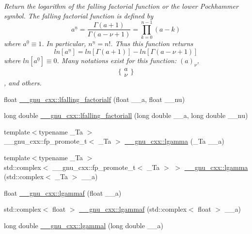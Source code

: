\begin{DoxyCompactItemize}
\begin{DoxyCompactList}\small\item\em Return the logarithm of the falling factorial function or the lower Pochhammer symbol. The falling factorial function is defined by \[ a^{\underline{n}} = \frac{\Gamma(a + 1)}{\Gamma(a - \nu + 1)} = \prod_{k=0}^{n-1} (a - k) \] where $ a^{\underline{0}} \equiv 1 $. In particular, $ n^{\underline{n}} = n! $. Thus this function returns \[ ln[a^{\underline{n}}] = ln[\Gamma(a + 1)] - ln[\Gamma(a - \nu + 1)] \] where $ ln[a^{\underline{0}}] \equiv 0 $. Many notations exist for this function\+: $ (a)_\nu $, \[ \{ \begin{array}{c} a \\ \nu \end{array} \} \], and others. \end{DoxyCompactList}\item 
float \hyperlink{group__gnu__math__spec__func_ga59ad7045c90aa1e3bc671e2eb6b8a2a7}{\+\_\+\+\_\+gnu\+\_\+cxx\+::lfalling\+\_\+factorialf} (float \+\_\+\+\_\+a, float \+\_\+\+\_\+nu)
\item 
long double \hyperlink{group__gnu__math__spec__func_gaa69b6c70e000b073d7f0f17199b1feb0}{\+\_\+\+\_\+gnu\+\_\+cxx\+::lfalling\+\_\+factoriall} (long double \+\_\+\+\_\+a, long double \+\_\+\+\_\+nu)
\item 
{\footnotesize template$<$typename \+\_\+\+Ta $>$ }\\\+\_\+\+\_\+gnu\+\_\+cxx\+::fp\+\_\+promote\+\_\+t$<$ \+\_\+\+Ta $>$ \hyperlink{group__gnu__math__spec__func_ga40fa5127f7c419ed1d8f1c6a6f96ea9b}{\+\_\+\+\_\+gnu\+\_\+cxx\+::lgamma} (\+\_\+\+Ta \+\_\+\+\_\+a)
\item 
{\footnotesize template$<$typename \+\_\+\+Ta $>$ }\\std\+::complex$<$ \+\_\+\+\_\+gnu\+\_\+cxx\+::fp\+\_\+promote\+\_\+t$<$ \+\_\+\+Ta $>$ $>$ \hyperlink{group__gnu__math__spec__func_ga93530dc48fbf301835215cdffedc42d8}{\+\_\+\+\_\+gnu\+\_\+cxx\+::lgamma} (std\+::complex$<$ \+\_\+\+Ta $>$ \+\_\+\+\_\+a)
\item 
float \hyperlink{group__gnu__math__spec__func_ga37956b360838b5b2f98c8e5cfd15d307}{\+\_\+\+\_\+gnu\+\_\+cxx\+::lgammaf} (float \+\_\+\+\_\+a)
\item 
std\+::complex$<$ float $>$ \hyperlink{group__gnu__math__spec__func_ga5b10ee6e92d8707a151b00086889b2ea}{\+\_\+\+\_\+gnu\+\_\+cxx\+::lgammaf} (std\+::complex$<$ float $>$ \+\_\+\+\_\+a)
\item 
long double \hyperlink{group__gnu__math__spec__func_gabc66f234f4554cd5ff878792cc85bd37}{\+\_\+\+\_\+gnu\+\_\+cxx\+::lgammal} (long double \+\_\+\+\_\+a)

\end{DoxyCompactItemize}
